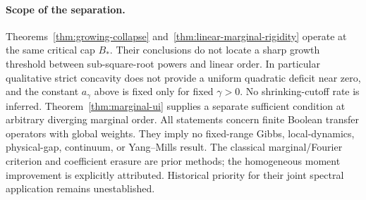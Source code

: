 \paragraph{Scope of the separation.}
Theorems~\ref{thm:growing-collapse} and~\ref{thm:linear-marginal-rigidity}
operate at the same critical cap $B_*$. Their conclusions do not locate a
sharp growth threshold between sub-square-root powers and linear order.
In particular qualitative strict concavity does not provide a uniform
quadratic deficit near zero, and the constant $a_\gamma$ above is fixed
only for fixed $\gamma>0$. No shrinking-cutoff rate is inferred.
Theorem~\ref{thm:marginal-ui} supplies a separate sufficient condition at
arbitrary diverging marginal order. All statements concern finite Boolean
transfer operators with global weights. They imply no fixed-range Gibbs,
local-dynamics, physical-gap, continuum, or Yang--Mills result.
The classical marginal/Fourier criterion and coefficient erasure are prior
methods; the homogeneous moment improvement is explicitly attributed.
Historical priority for their joint spectral application remains unestablished.

